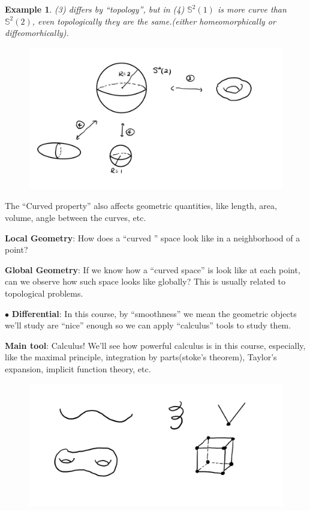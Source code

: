 \documentclass[UTF8,oneside,11pt]{book}
\theoremstyle{plain}\newtheorem{thm}{Theorem}
\theoremstyle{definition}\newtheorem{defn}[thm]{Definition}
\theoremstyle{plain}\newtheorem{axiom}[thm]{Axiom}
\theoremstyle{plain}\newtheorem{coro}[thm]{Corollary}
\theoremstyle{plain}\newtheorem{lemma}[thm]{Lemma}
\theoremstyle{plain}\newtheorem{prop}[thm]{Proposition}
\theoremstyle{plain}\newtheorem{conj}[thm]{Conjecture}
\theoremstyle{plain}\newtheorem{ques}[thm]{Problem}
\theoremstyle{plain}\newtheorem{const}[thm]{Construction}
\theoremstyle{remark}\newtheorem{notation}[thm]{Notation}
\theoremstyle{plain}\newtheorem*{app}{Application}
\theoremstyle{plain}\newtheorem*{exam}{Example}
\theoremstyle{plain}\newtheorem*{exer}{Exercise}
\theoremstyle{remark}\newtheorem*{remark}{Remark}
\theoremstyle{remark}\newtheorem*{note}{\small{Note}}
\numberwithin{equation}{section}
\numberwithin{thm}{section}
\begin{document}
\begin{exam}
    (3) differs by ``topology'', but in (4) $\mathbb{S}^2\left(1\right)$ is more curve than $\mathbb{S}^2\left(2\right)$, even topologically they are the same.(either homeomorphically or diffeomorhically).
\end{exam}
\begin{figure}[H]\centering
    \includegraphics[scale=0.2]{picture/preface_example2.jpg}
\end{figure}
The ``Curved property'' also affects geometric quantities, like length, area, volume, angle between the curves, etc.\par
\textbf{Local Geometry}: How does a ``curved '' space look like in a neighborhood of a point?\par 
\textbf{Global Geometry}: If we know how a ``curved space'' is look like at each point, can we observe how such space looks like globally? This is usually related to topological problems.\par
$\bullet$ \textbf{Differential}: In this course, by ``smoothness'' we mean the geometric objects we'll study are ``nice'' enough so we can apply ``calculus'' tools to study them.\par
\textbf{Main tool}: Calculus! We'll see how powerful calculus is in this course, especially, like the maximal principle, integration by parts(stoke's theorem), Taylor's expansion, implicit function theory, etc.
    \begin{figure}[H]\centering
        \includegraphics[scale=0.2]{picture/preface_example3.jpg}
    \end{figure}
\end{document}
